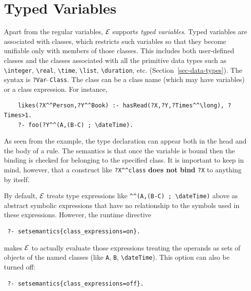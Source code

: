 \documentclass[11pt]{article}
\newcommand{\ERGO}{\mbox{\ensuremath{\cal{E}}\smaller{{\sc{RGO}}}}\xspace}
\newcommand{\FLSYSTEM}{\ERGO}
\newcommand{\bs}{\textbackslash}
\begin{document}
\section{Typed Variables} \label{sec-typedvars}

Apart from the regular variables, \FLSYSTEM supports \emph{typed variables}.
Typed variables are associated with classes, which restricts such variables so that
they become unifiable only with members of those classes. This
includes both user-defined classes and the classes associated with all the primitive data types such as 
\texttt{\bs{}integer}, \texttt{\bs{}real}, \texttt{\bs{}time},
\texttt{\bs{}list}, \texttt{\bs{}duration},
etc. (Section~\ref{sec-data-types}).
The syntax is \texttt{?Var$\hat{~}\hat{~}$Class}. The class can be a class
name (which may have variables) or a class expression. For instance,
\begin{verbatim}
    likes(?X^^Person,?Y^^Book) :- hasRead(?X,?Y,?Times^^\long), ?Times>1.
    ?- foo(?Y^^(A,(B-C) ; \dateTime).
\end{verbatim}
As seen from the example, the type declaration can appear both in the head
and the body of a rule. The semantics is that once the variable is bound 
then the binding is checked for belonging to the specified
class. It is important to keep in mind, however, that a construct like
\verb|?X^^class| \textbf{does not bind} \texttt{?X} to anything by itself.   

By default, \ERGO treats type expressions like
\verb|^^(A,(B-C) ; \dateTime)| above as abstract symbolic expressions that
have no relationship to the symbols used in these expressions.
However, the  runtime directive 
\begin{verbatim}
 ?- setsemantics{class_expressions=on}.
\end{verbatim}
makes \ERGO to actually evaluate those expressions treating the operands
as sets of objects of the named classes (like \texttt{A}, \texttt{B},
\texttt{\bs{}dateTime}).   
This option can also be turned off:
\begin{verbatim}
 ?- setsemantics{class_expressions=off}.
\end{verbatim}
\end{document}

